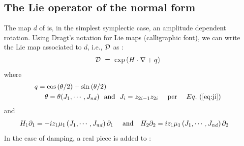 \documentclass{hitec}     %
\begin{document}
{{{{{{{{{{{{{{{{{{{  \subsection{The Lie operator of the normal form}\label{s:lienorm}

The map $d$ of  is, in the simplest symplectic case, an amplitude dependent rotation. Using Dragt's notation for Lie maps (calligraphic font), we can write the Lie map associated to $d$, i.e., $\cal D$ as :
%
\begin{align} {\cal D}\ =
\ \exp\left({H\cdot \nabla +q}\right)  \label{eq:lied}\end{align}
%
where
%
\begin{align} q&=\cos\left({\theta /2}\right) + \sin\left({\theta /2}\right)\ \ \ \label{eq:qnorm}\ \  \\ \ &\ \ \ \theta =
\theta ({J}_{1},\cdots,{J}_{nd})~~{\rm a}{\rm n}{\rm d} ~~{J}_{i}=
{z}_{2i-1}{z}_{2i}\ \ \ \ {\rm p}{\rm e}{\rm r}\ \ \ \ \Eq{eq:ji} \nonumber 
\end{align}
and
%
\begin{align} {H}_{1}{\partial }_{1}&=-i{z}_{1}{\mu }_{1}\left({{J}_{1},\cdots,{J}_{nd}}\right){\partial }_{1}\ ~~~{\rm a}{\rm n}{\rm d} ~~~{H}_{2}{\partial }_{2}=
i{z}_{1}{\mu }_{1}\left({{J}_{1},\cdots,{J}_{nd}}\right){\partial }_{2} \label{eq:ampdts}\end{align}
%
In the case of damping, a real piece is added to :
}}}}}}}}}}}}}}}}}}}
\end{document}
